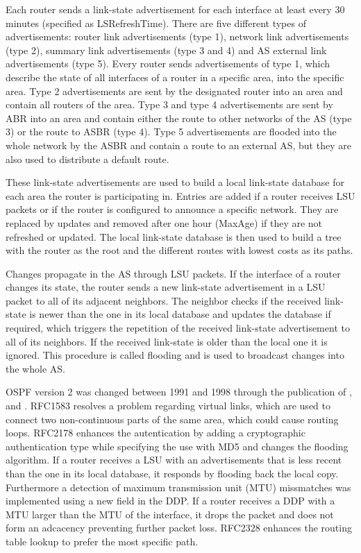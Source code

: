 \documentclass{acm_proc_article-sp}
\begin{document}
Each router sends a link-state advertisement for each interface at least every 30 minutes (specified as LSRefreshTime). There are five different types of advertisements: router link advertisements (type 1), network link advertisements (type 2), summary link advertisements (type 3 and 4) and AS external link advertisements (type 5). Every router sends advertisements of type 1, which describe the state of all interfaces of a router in a specific area, into the specific area. Type 2 advertisements are sent by the designated router into an area and contain all routers of the area. Type 3 and type 4 advertisements are sent by ABR into an area and contain either the route to other networks of the AS (type 3) or the route to ASBR (type 4). Type 5 advertisements are flooded into the whole network by the ASBR and contain a route to an external AS, but they are also used to distribute a default route.

These link-state advertisements are used to build a local link-state database for each area the router is participating in. Entries are added if a router receives LSU packets or if the router is configured to announce a specific network. They are replaced by updates and removed after one hour (MaxAge) if they are not refreshed or updated. The local link-state database is then used to build a tree with the router as the root and the different routes with lowest costs as its paths.

Changes propagate in the AS through LSU packets. If the interface of a router changes its state, the router sends a new link-state advertisement in a LSU packet to all of its adjacent neighbors. The neighbor checks if the received link-state is newer than the one in its local database and updates the database if required, which triggers the repetition of the received link-state advertisement to all of its neighbors. If the received link-state is older than the local one it is ignored. This procedure is called flooding and is used to broadcast changes into the whole AS.

OSPF version 2 was changed between 1991 and 1998 through the publication of \cite{RFC1538}, \cite{RFC2178} and \cite{RFC2328}. RFC1583 resolves a problem regarding virtual links, which are used to connect two non-continuous parts of the same area, which could cause routing loops. RFC2178 enhances the autentication by adding a cryptographic authentication type while specifying the use with MD5 and changes the flooding algorithm. If a router receives a LSU with an advertisements that is less recent than the one in its local database, it responds by flooding back the local copy. Furthermore a detection of maximum transmission unit (MTU) missmatches was implemented using a new field in the DDP. If a router receives a DDP with a MTU larger than the MTU of the interface, it drops the packet and does not form an adcacency preventing further packet loss. RFC2328 enhances the routing table lookup to prefer the most specific path.
\end{document}
